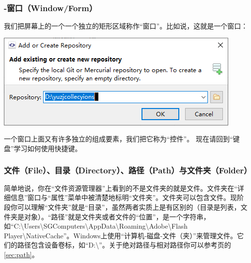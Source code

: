 \subsubsection{-窗口（Window/Form）}
\label{sec:Frm}
我们把屏幕上的一个一个独立的矩形区域称作“窗口”。比如说，这就是一个窗口：
\begin{center}
	\includegraphics{pic/forcus1}
\end{center} \par
一个窗口上面又有许多独立的组成要素，我们把它称为“控件”。
现在请回到“键盘”学习如何使用快捷键。
\subsubsection{文件（File）、目录（Directory）、路径（Path）与文件夹（Folder）}
简单地说，你在“文件资源管理器”上看到的不是文件夹的就是文件。文件夹在“详细信息”窗口与“属性”菜单中被清楚地标明“文件夹”。文件夹可以包含文件。现阶段你可以理解“文件夹”就是“目录”，虽然两者实质上是有区别的（目录是列表，文件夹是对象）。“路径”就是文件夹或者文件的“位置”，是一个字符串，如“C:\textbackslash Users\textbackslash SGComputers\textbackslash AppData\textbackslash Roaming\textbackslash Adobe\textbackslash Flash Player\textbackslash NativeCache”。Windows上使用“计算机-磁盘-文件（夹）”来管理文件。它们的路径包含设备卷标，如“D:\textbackslash”。关于绝对路径与相对路径你可以参考\pageref{sec:path}页的\ref{sec:path}。
